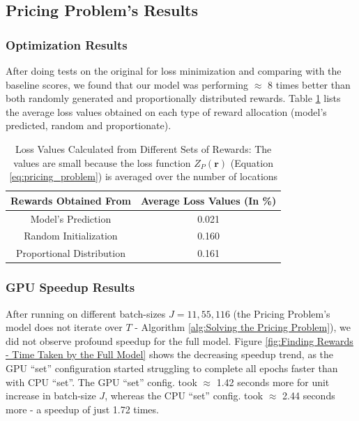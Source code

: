 \documentclass[12pt]{article}
\newcommand{\vect}[1]{\mathbf{#1}}  %
\begin{document}
    \subsection{Pricing Problem's Results} \label{sec:Pricing Problem's Results}
    \subsubsection{Optimization Results} \label{sec:PriProbRes - Optimization}
    After doing tests on the original for loss minimization and comparing with the baseline scores, we found that our model was performing $\approx$ 8 times better than both randomly generated and proportionally distributed rewards. Table \ref{tab:Loss Values Calculated from Different Sets of Rewards} lists the average loss values obtained on each type of reward allocation (model's predicted, random and proportionate).
    \begin{table}[!htbp]
        \centering
        \caption[Loss Values Calculated from Different Sets of Rewards]{Loss Values Calculated from Different Sets of Rewards: The values are small because the loss function $Z_P(\vect{r})$ (Equation \ref{eq:pricing_problem}) is averaged over the number of locations}
        \label{tab:Loss Values Calculated from Different Sets of Rewards}
        \begin{tabular}{|c|c|}
            \hline
            \textbf{Rewards Obtained From} & \textbf{Average Loss Values (In \%)}\\
            \hline
            Model's Prediction & 0.021\\
            Random Initialization & 0.160\\
            Proportional Distribution & 0.161\\
            \hline
        \end{tabular}
    \end{table}
    
    \subsubsection{GPU Speedup Results} \label{sec:PriProbRes - GPU}
    After running on different batch-sizes $J = 11, 55, 116$ (the Pricing Problem's model does not iterate over $T$ - Algorithm \ref{alg:Solving the Pricing Problem}), we did not observe profound speedup for the full model. Figure \ref{fig:Finding Rewards - Time Taken by the Full Model} shows the decreasing speedup trend, as the GPU ``set'' configuration started struggling to complete all epochs faster than with CPU ``set''. The GPU ``set'' config. took $\approx$ 1.42 seconds more for unit increase in batch-size $J$, whereas the CPU ``set'' config. took $\approx$ 2.44 seconds more - a speedup of just 1.72 times.
    
\end{document}
